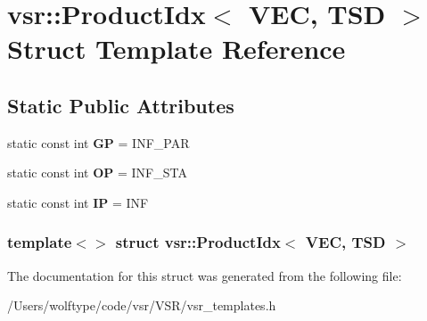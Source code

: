 \hypertarget{structvsr_1_1_product_idx_3_01_v_e_c_00_01_t_s_d_01_4}{\section{vsr\-:\-:Product\-Idx$<$ V\-E\-C, T\-S\-D $>$ Struct Template Reference}
\label{structvsr_1_1_product_idx_3_01_v_e_c_00_01_t_s_d_01_4}
}
\subsection*{Static Public Attributes}
\begin{DoxyCompactItemize}
\item 
\hypertarget{structvsr_1_1_product_idx_3_01_v_e_c_00_01_t_s_d_01_4_aac664b526e5c56ff222c443acb73ef7b}{static const int {\bfseries G\-P} = I\-N\-F\-\_\-\-P\-A\-R}\label{structvsr_1_1_product_idx_3_01_v_e_c_00_01_t_s_d_01_4_aac664b526e5c56ff222c443acb73ef7b}

\item 
\hypertarget{structvsr_1_1_product_idx_3_01_v_e_c_00_01_t_s_d_01_4_a1c064d4fb9e55aca102d44d91bcd96e5}{static const int {\bfseries O\-P} = I\-N\-F\-\_\-\-S\-T\-A}\label{structvsr_1_1_product_idx_3_01_v_e_c_00_01_t_s_d_01_4_a1c064d4fb9e55aca102d44d91bcd96e5}

\item 
\hypertarget{structvsr_1_1_product_idx_3_01_v_e_c_00_01_t_s_d_01_4_a7a39180670ded3cabd569d7fc69c59ad}{static const int {\bfseries I\-P} = I\-N\-F}\label{structvsr_1_1_product_idx_3_01_v_e_c_00_01_t_s_d_01_4_a7a39180670ded3cabd569d7fc69c59ad}

\end{DoxyCompactItemize}
\subsubsection*{template$<$$>$ struct vsr\-::\-Product\-Idx$<$ V\-E\-C, T\-S\-D $>$}



The documentation for this struct was generated from the following file\-:\begin{DoxyCompactItemize}
\item 
/\-Users/wolftype/code/vsr/\-V\-S\-R/vsr\-\_\-templates.\-h\end{DoxyCompactItemize}
